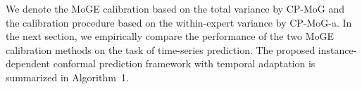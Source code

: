 We denote the MoGE calibration based on the total variance by CP-MoG and the calibration procedure based on the within-expert variance by CP-MoG-a. 
In the next section, we empirically compare the performance of the two MoGE calibration methods on the task of time-series prediction.    
The proposed instance-dependent conformal prediction framework with temporal adaptation is summarized in Algorithm~1. 





